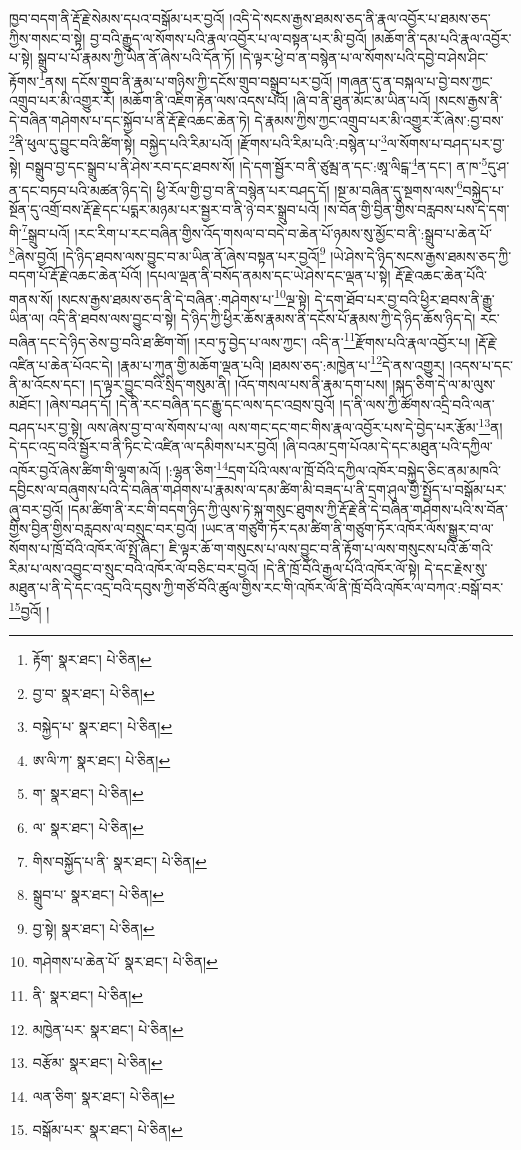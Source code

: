 ཁྱབ་བདག་ནི་རྡོ་རྗེ་སེམས་དཔའ་བསྒོམ་པར་བྱའོ། །འདི་དེ་སངས་རྒྱས་ཐམས་ཅད་ནི་རྣལ་འབྱོར་པ་ཐམས་ཅད་ཀྱིས་གསང་བ་སྟེ། བྱ་བའི་རྒྱུད་ལ་སོགས་པའི་རྣལ་འབྱོར་པ་ལ་བསྟན་པར་མི་བྱའོ། །མཆོག་ནི་དམ་པའི་རྣལ་འབྱོར་པ་སྟེ། སྒྲུབ་པ་པོ་རྣམས་ཀྱི་ཡིན་ནོ་ཞེས་པའི་དོན་ཏོ། །དེ་ལྟར་ཕྱེ་བ་ན་བསྙེན་པ་ལ་སོགས་པའི་དབྱེ་བ་ཤེས་ཤིང་རྟོགས་\footnote{རྟོག་  སྣར་ཐང་།  པེ་ཅིན། }ནས། དངོས་གྲུབ་ནི་རྣམ་པ་གཉིས་ཀྱི་དངོས་གྲུབ་བསྒྲུབ་པར་བྱའོ། །གཞན་དུ་ན་བསྐལ་པ་བྱེ་བས་ཀྱང་འགྲུབ་པར་མི་འགྱུར་རོ། །མཆོག་ནི་འཇིག་རྟེན་ལས་འདས་པའོ། །ཞི་བ་ནི་ཐུན་མོང་མ་ཡིན་པའོ། །སངས་རྒྱས་ནི་དེ་བཞིན་གཤེགས་པ་དང་སྐྱོབ་པ་ནི་རྡོ་རྗེ་འཆང་ཆེན་ཏེ། དེ་རྣམས་ཀྱིས་ཀྱང་འགྲུབ་པར་མི་འགྱུར་རོ་ཞེས་:བྱ་བས་\footnote{བྱ་བ་  སྣར་ཐང་།  པེ་ཅིན། }ནི་ཕུལ་དུ་བྱུང་བའི་ཚིག་སྟེ། བསྐྱེད་པའི་རིམ་པའོ། །རྫོགས་པའི་རིམ་པའི་:བསྙེན་པ་\footnote{བསྐྱེད་པ་  སྣར་ཐང་།  པེ་ཅིན། }ལ་སོགས་པ་བཤད་པར་བྱ་སྟེ། བསྒྲུབ་བྱ་དང་སྒྲུབ་པ་ནི་ཤེས་རབ་དང་ཐབས་སོ། །དེ་དག་སྦྱོར་བ་ནི་ཙུམྦ་ན་དང་:ཨཱ་ལིངྒ་\footnote{ཨ་ལི་ཀ་  སྣར་ཐང་།  པེ་ཅིན། }ན་དང་། ན་ཁ་\footnote{ག་  སྣར་ཐང་།  པེ་ཅིན། }དུ་ཤ་ན་དང་བཏབ་པའི་མཚན་ཉིད་དེ། ཕྱི་རོལ་གྱི་བྱ་བ་ནི་བསྙེན་པར་བཤད་དོ། །སྔ་མ་བཞིན་དུ་སྔགས་ལས་\footnote{ལ་  སྣར་ཐང་།  པེ་ཅིན། }བསྐྱེད་པ་སྔོན་དུ་འགྲོ་བས་རྡོ་རྗེ་དང་པདྨར་མཉམ་པར་སྦྱར་བ་ནི་ཉེ་བར་སྒྲུབ་པའོ། །ས་བོན་གྱི་བྱིན་གྱིས་བརླབས་པས་དེ་དག་གི་\footnote{གིས་བསྐྱོད་པ་ནི་  སྣར་ཐང་།  པེ་ཅིན། }སྒྲུབ་པའོ། །རང་རིག་པ་རང་བཞིན་གྱིས་འོད་གསལ་བ་བདེ་བ་ཆེན་པོ་ཉམས་སུ་མྱོང་བ་ནི་:སྒྲུབ་པ་ཆེན་པོ་\footnote{སྒྲུབ་པ་  སྣར་ཐང་།  པེ་ཅིན། }ཞེས་བྱའོ། །དེ་ཉིད་ཐབས་ལས་བྱུང་བ་མ་ཡིན་ནོ་ཞེས་བསྟན་པར་བྱའོ།\footnote{བྱ་སྟེ།  སྣར་ཐང་།  པེ་ཅིན། } །ཡེ་ཤེས་དེ་ཉིད་སངས་རྒྱས་ཐམས་ཅད་ཀྱི་བདག་པོ་རྡོ་རྗེ་འཆང་ཆེན་པོའོ། །དཔལ་ལྡན་ནི་བསོད་ནམས་དང་ཡེ་ཤེས་དང་ལྡན་པ་སྟེ། རྡོ་རྗེ་འཆང་ཆེན་པོའི་གནས་སོ། །སངས་རྒྱས་ཐམས་ཅད་ནི་དེ་བཞིན་:གཤེགས་པ་\footnote{གཤེགས་པ་ཆེན་པོ་  སྣར་ཐང་།  པེ་ཅིན། }ལྔ་སྟེ། དེ་དག་ཐོབ་པར་བྱ་བའི་ཕྱིར་ཐབས་ནི་རྒྱུ་ཡིན་ལ། འདི་ནི་ཐབས་ལས་བྱུང་བ་སྟེ། དེ་ཉིད་ཀྱི་ཕྱིར་ཆོས་རྣམས་ནི་དངོས་པོ་རྣམས་ཀྱི་དེ་ཉིད་ཆོས་ཉིད་དེ། རང་བཞིན་དང་དེ་ཉིད་ཅེས་བྱ་བའི་ཐ་ཚིག་གོ། །རབ་ཏུ་བྱེད་པ་ལས་ཀྱང་། འདི་ན་\footnote{ནི་  སྣར་ཐང་།  པེ་ཅིན། }རྫོགས་པའི་རྣལ་འབྱོར་པ། །རྡོ་རྗེ་འཛིན་པ་ཆེན་པོའང་དེ། །རྣམ་པ་ཀུན་གྱི་མཆོག་ལྡན་པའི། །ཐམས་ཅད་:མཁྱེན་པ་\footnote{མཁྱེན་པར་  སྣར་ཐང་།  པེ་ཅིན། }དེ་ནས་འགྱུར། །འདས་པ་དང་ནི་མ་འོངས་དང་། །ད་ལྟར་བྱུང་བའི་སྲིད་གསུམ་ནི། །འོད་གསལ་པས་ནི་རྣམ་དག་པས། །སྐད་ཅིག་དེ་ལ་མ་ལུས་མཐོང་། །ཞེས་བཤད་དོ། །དེ་ནི་རང་བཞིན་དང་རྒྱུ་དང་ལས་དང་འབྲས་བུའོ། །ད་ནི་ལས་ཀྱི་ཚོགས་འདྲི་བའི་ལན་བཤད་པར་བྱ་སྟེ། ལས་ཞེས་བྱ་བ་ལ་སོགས་པ་ལ། ལས་གང་དང་གང་གིས་རྣལ་འབྱོར་པས་དེ་བྱེད་པར་རྩོམ་\footnote{བརྩོམ་  སྣར་ཐང་།  པེ་ཅིན། }ན། དེ་དང་འདྲ་བའི་སྦྱོར་བ་ནི་ཏིང་ངེ་འཛིན་ལ་དམིགས་པར་བྱའོ། །ཞི་བའམ་དྲག་པོའམ་དེ་དང་མཐུན་པའི་དཀྱིལ་འཁོར་བྱའོ་ཞེས་ཚིག་གི་ལྷག་མའོ། །:ལྷན་ཅིག་\footnote{ལན་ཅིག་  སྣར་ཐང་།  པེ་ཅིན། }དྲག་པོའི་ལས་ལ་ཁྲོ་བོའི་དཀྱིལ་འཁོར་བསྐྱེད་ཅིང་ནམ་མཁའི་དབྱིངས་ལ་བཞུགས་པའི་དེ་བཞིན་གཤེགས་པ་རྣམས་ལ་དམ་ཚིག་མི་བཟད་པ་ནི་དྲག་ཤུལ་གྱི་སྤྱོད་པ་བསྒོམ་པར་ཞུ་བར་བྱའོ། །དམ་ཚིག་ནི་རང་གི་བདག་ཉིད་ཀྱི་ལུས་ཏེ་སྐུ་གསུང་ཐུགས་ཀྱི་རྡོ་རྗེ་ནི་དེ་བཞིན་གཤེགས་པའི་ས་བོན་གྱིས་བྱིན་གྱིས་བརླབས་ལ་བསྲུང་བར་བྱའོ། །ཡང་ན་གཙུག་ཏོར་དམ་ཚིག་ནི་གཙུག་ཏོར་འཁོར་ལོས་སྒྱུར་བ་ལ་སོགས་པ་ཁྲོ་བོའི་འཁོར་ལོ་སྤྲོ་ཞིང་། ཇི་ལྟར་ཆོ་ག་གསུངས་པ་ལས་བྱུང་བ་ནི་རྟོག་པ་ལས་གསུངས་པའི་ཆོ་གའི་རིམ་པ་ལས་འབྱུང་བ་སྲུང་བའི་འཁོར་ལོ་བཅིང་བར་བྱའོ། །དེ་ནི་ཁྲོ་བོའི་རྒྱལ་པོའི་འཁོར་ལོ་སྟེ། དེ་དང་རྗེས་སུ་མཐུན་པ་ནི་དེ་དང་འདྲ་བའི་དབུས་ཀྱི་གཙོ་བོའི་ཚུལ་གྱིས་རང་གི་འཁོར་ལོ་ནི་ཁྲོ་བོའི་འཁོར་ལ་བཀའ་:བསྒོ་བར་\footnote{བསྒོམ་པར་  སྣར་ཐང་།  པེ་ཅིན། }བྱའོ། །
